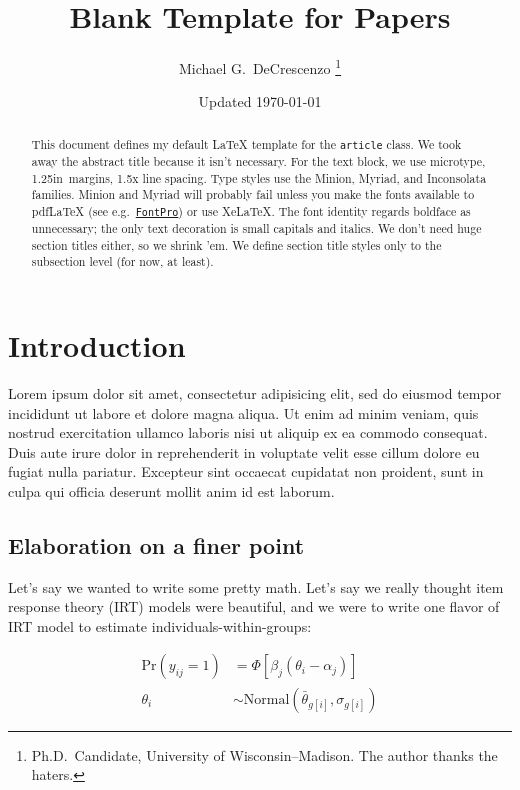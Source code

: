 \documentclass[12pt
              ]{article}
\begin{document}
\title{Blank Template for Papers}
\author{Michael G.\ DeCrescenzo%
          \thanks{Ph.D.\ Candidate, University of Wisconsin--Madison. The author thanks the haters.}}
\date{Updated \today}
\maketitle


\begin{abstract}
  This document defines my default {\LaTeX} template for the \texttt{article} class. We took away the abstract title because it isn't necessary. For the text block, we use microtype, 1.25in\ margins, 1.5x line spacing. Type styles use the Minion, Myriad, and Inconsolata families. Minion and Myriad will probably fail unless you make the fonts available to pdf{\LaTeX} (see e.g.\ \href{https://github.com/sebschub/FontPro}{\texttt{FontPro}}) or use Xe{\LaTeX}. The font identity regards boldface as unnecessary; the only text decoration is small capitals and italics. We don't need huge section titles either, so we shrink 'em. We define section title styles only to the subsection level (for now, at least).
\end{abstract}

\vspace{12pt}


\onehalfspacing


\section*{Introduction}

Lorem ipsum dolor sit amet, consectetur adipisicing elit, sed do eiusmod
tempor incididunt ut labore et dolore magna aliqua. Ut enim ad minim veniam,
quis nostrud exercitation ullamco laboris nisi ut aliquip ex ea commodo
consequat. Duis aute irure dolor in reprehenderit in voluptate velit esse
cillum dolore eu fugiat nulla pariatur. Excepteur sint occaecat cupidatat non
proident, sunt in culpa qui officia deserunt mollit anim id est laborum.


\subsection*{Elaboration on a finer point}

Let's say we wanted to write some pretty math. Let's say we really thought item response theory (IRT) models were beautiful, and we were to write one flavor of IRT model to estimate individuals-within-groups:

\begin{align}
  \mathrm{Pr}\left( y_{ij} = 1 \right)
  &=
  \Phi \left[
    \beta_{j} \left( \theta_{i} - \alpha_{j} \right)
  \right] \\
  \theta_{i} &\sim \mathrm{Normal}\left(\bar{\theta}_{g[i]}, \sigma_{g[i]} \right)
\end{align}



\newpage
\printbibliography
\end{document}
